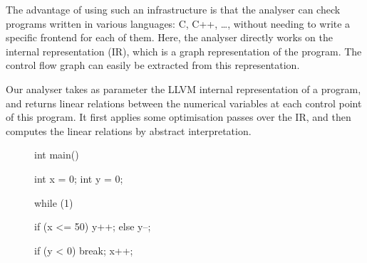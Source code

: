 \documentclass[a4paper,english,titlepage,11pt]{report}
\begin{document}
The advantage of using such an infrastructure is that the analyser can check
programs written in various languages: C, C++, \dots, without needing to write
a specific frontend for each of them. Here, the analyser directly works on the
internal representation (IR), which is a graph representation of
the program. The control flow graph can easily be extracted from
this representation.

Our analyser takes as parameter the LLVM internal representation of a program,
and returns linear relations between the numerical variables at each control
point of this program. It first applies some optimisation passes over the IR,
and then computes the linear relations by abstract interpretation.

\begin{figure}[!h]
\begin{minipage}[c]{.35\linewidth}
{\small
\begin{C}
int main() {
   int x = 0;
   int y = 0;

   while (1) {
      if (x <= 50) y++;
      else y--;

      if (y < 0) break;
      x++;
   }
}
\end{C}
}
\end{minipage}
\begin{minipage}[c]{.69\linewidth}


\end{minipage}
\end{figure}
\end{document}
